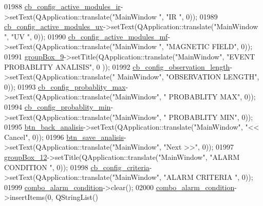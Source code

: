 \begin{DoxyCode}
01988         \hyperlink{a00080_abef4ef3d5d03026de5d5e172eb0335a6}{cb\_config\_active\_modules\_ir}->setText(QApplication::translate(\textcolor{stringliteral}{"MainWindow
      "}, \textcolor{stringliteral}{"IR                "}, 0));
01989         \hyperlink{a00080_a72ad8a6b100948f9b1438cf3b949be5e}{cb\_config\_active\_modules\_uv}->setText(QApplication::translate(\textcolor{stringliteral}{"MainWindow
      "}, \textcolor{stringliteral}{"UV            "}, 0));
01990         \hyperlink{a00080_abc96d02b5b7a9480a2a142008e99a100}{cb\_config\_active\_modules\_mf}->setText(QApplication::translate(\textcolor{stringliteral}{"MainWindow
      "}, \textcolor{stringliteral}{"MAGNETIC FIELD"}, 0));
01991         \hyperlink{a00080_ab492988d340548c7f30e098419ef10ee}{groupBox\_9}->setTitle(QApplication::translate(\textcolor{stringliteral}{"MainWindow"}, \textcolor{stringliteral}{"EVENT PROBABLITY ANALISIS"}, 0
      ));
01992         \hyperlink{a00080_ae9e8f3f0d147a4cd21c8f36ffb3bd81f}{cb\_config\_observation\_length}->setText(QApplication::translate(\textcolor{stringliteral}{"
      MainWindow"}, \textcolor{stringliteral}{"OBSERVATION LENGTH"}, 0));
01993         \hyperlink{a00080_ad0a7ea02564c112595f0d30efa75eef2}{cb\_config\_probablity\_max}->setText(QApplication::translate(\textcolor{stringliteral}{"MainWindow"}, \textcolor{stringliteral}{"
      PROBABLITY MAX"}, 0));
01994         \hyperlink{a00080_a6e32cc42adcf308df94cbbc9ac226f50}{cb\_config\_probablity\_min}->setText(QApplication::translate(\textcolor{stringliteral}{"MainWindow"}, \textcolor{stringliteral}{"
      PROBABLITY MIN"}, 0));
01995         \hyperlink{a00080_a5704296b847187d5975858d04c8c2513}{btn\_back\_analisis}->setText(QApplication::translate(\textcolor{stringliteral}{"MainWindow"}, \textcolor{stringliteral}{"<< Cancel"}, 0));
01996         \hyperlink{a00080_a231adeaeca96ac21170495bfb1422e5e}{btn\_save\_analisis}->setText(QApplication::translate(\textcolor{stringliteral}{"MainWindow"}, \textcolor{stringliteral}{"Next >>"}, 0));
01997         \hyperlink{a00080_af55cd87dbe0f7d42980b1012f15cae2d}{groupBox\_12}->setTitle(QApplication::translate(\textcolor{stringliteral}{"MainWindow"}, \textcolor{stringliteral}{"ALARM CONDITION "}, 0));
01998         \hyperlink{a00080_a89574c631636929702a5928b2a159892}{cb\_config\_criteria}->setText(QApplication::translate(\textcolor{stringliteral}{"MainWindow"}, \textcolor{stringliteral}{"ALARM CRITERIA
      "}, 0));
01999         \hyperlink{a00080_a2af463e4a88fddd219f2e41a386fbd68}{combo\_alarm\_condition}->clear();
02000         \hyperlink{a00080_a2af463e4a88fddd219f2e41a386fbd68}{combo\_alarm\_condition}->insertItems(0, QStringList()

\end{DoxyCode}
